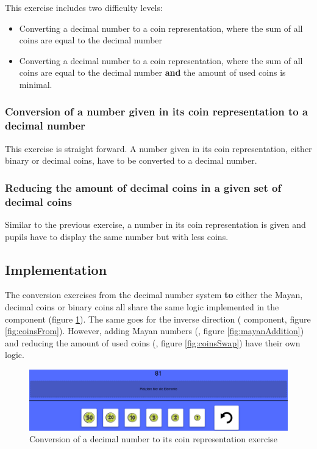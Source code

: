This exercise includes two difficulty levels:
\begin{itemize}
    \item Converting a decimal number to a coin representation, where the sum of all coins are equal to the decimal number
    \item Converting a decimal number to a coin representation, where the sum of all coins are equal to the decimal number \textbf{and} the amount of used coins is minimal.
\end{itemize}

\subsubsection*{Conversion of a number given in its coin representation to a decimal number}

This exercise is straight forward. A number given in its coin representation, either binary or decimal coins, have to be converted to a decimal number. 

\subsubsection*{Reducing the amount of decimal coins in a given set of decimal coins}

Similar to the previous exercise, a number in its coin representation is given and pupils have to display the same number but with less coins.

\subsection{Implementation}

The conversion exercises from the decimal number system \textbf{to} either the Mayan, decimal coins or binary coins all share the same logic implemented in the  component (figure \ref{fig:coinsTo}).
The same goes for the inverse direction ( component, figure \ref{fig:coinsFrom}).
However, adding Mayan numbers (, figure \ref{fig:mayanAddition}) and reducing the amount of used coins (, figure \ref{fig:coinsSwap}) have their own logic. 

\begin{figure} 
  \centering
  \includegraphics[width=1.0 \columnwidth]{figures/coins_to.png}
  \caption{Conversion of a decimal number to its coin representation exercise} 
  \label{fig:coinsTo} 
\end{figure}

